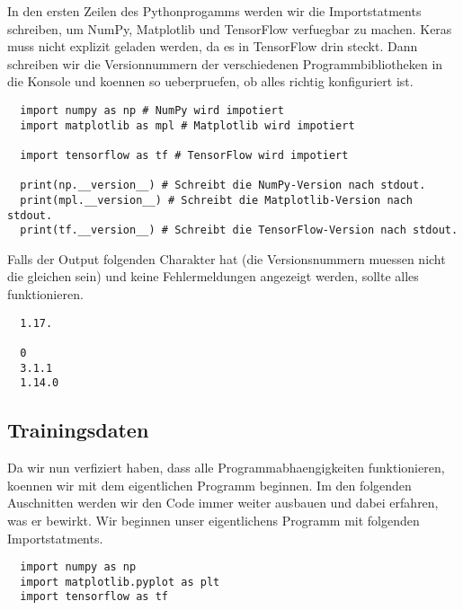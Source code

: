 In den ersten Zeilen des Pythonprogamms werden wir die Importstatments
schreiben, um NumPy, Matplotlib und TensorFlow verfuegbar zu machen.
Keras muss nicht explizit geladen werden, da es in TensorFlow drin steckt.
Dann schreiben wir die Versionnummern der verschiedenen Programmbibliotheken
in die Konsole und koennen so ueberpruefen, ob alles richtig konfiguriert ist.
\begin{verbatim}
  import numpy as np # NumPy wird impotiert
  import matplotlib as mpl # Matplotlib wird impotiert

  import tensorflow as tf # TensorFlow wird impotiert

  print(np.__version__) # Schreibt die NumPy-Version nach stdout.
  print(mpl.__version__) # Schreibt die Matplotlib-Version nach stdout.
  print(tf.__version__) # Schreibt die TensorFlow-Version nach stdout.
\end{verbatim}
Falls der Output folgenden Charakter hat (die Versionsnummern muessen nicht
die gleichen sein) und keine Fehlermeldungen angezeigt
werden, sollte alles funktionieren.
\begin{verbatim}
  1.17.

  0
  3.1.1
  1.14.0
\end{verbatim}
\para{}

\subsection{Trainingsdaten}
Da wir nun verfiziert haben, dass alle Programmabhaengigkeiten funktionieren,
koennen wir mit dem eigentlichen Programm beginnen.
\para{}
Im den folgenden Auschnitten werden wir den Code immer weiter ausbauen und dabei
erfahren, was er bewirkt. Wir beginnen unser eigentlichens Programm mit folgenden Importstatments.
\begin{verbatim}
  import numpy as np
  import matplotlib.pyplot as plt
  import tensorflow as tf
\end{verbatim}

